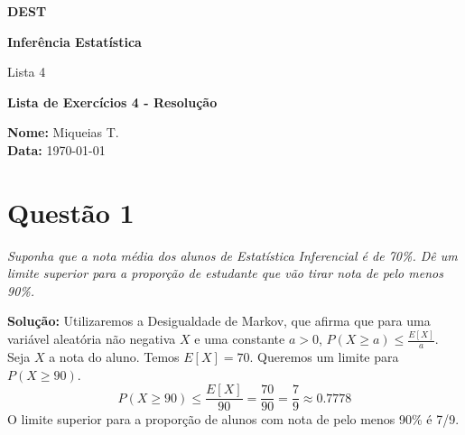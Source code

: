 \documentclass[12pt, a4paper]{article}
\begin{document}
\begin{titlepage}
    \centering


    {\Huge \textbf{DEST}}\par

    \vspace{2cm}

    {\Large \textbf{Inferência Estatística}} \par
    {\Large Lista 4 } \par

    \vspace{2.5cm}

    {\Large \textbf{Lista de Exercícios 4 - Resolução}}

    \vfill %

    \large
    \begin{flushleft}
    \textbf{Nome:} Miqueias T. \\
    \textbf{Data:} \today
    \end{flushleft}
\end{titlepage}


\section*{Questão 1}
\textit{Suponha que a nota média dos alunos de Estatística Inferencial é de 70\%. Dê um limite superior para a proporção de estudante que vão tirar nota de pelo menos 90\%.}

\textbf{Solução:}
Utilizaremos a Desigualdade de Markov, que afirma que para uma variável aleatória não negativa $X$ e uma constante $a > 0$, $P(X \ge a) \le \frac{E[X]}{a}$.
Seja $X$ a nota do aluno. Temos $E[X] = 70$. Queremos um limite para $P(X \ge 90)$.
$$ P(X \ge 90) \le \frac{E[X]}{90} = \frac{70}{90} = \frac{7}{9} \approx 0.7778 $$
O limite superior para a proporção de alunos com nota de pelo menos 90\% é 7/9.
\end{document}
